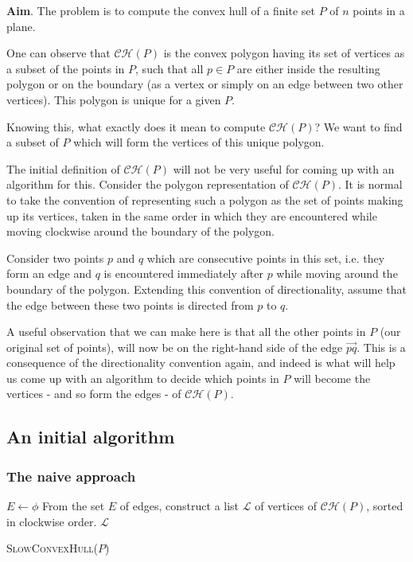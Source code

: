 \documentclass{article}
\begin{document}
\textbf{Aim}. The problem is to compute the convex hull of a finite set $P$ of $n$ points in a plane.

One can observe that $\mathcal{CH}(P)$ is the convex polygon having its set of vertices as a subset of the points in $P$, such that all $p \in P$ are either inside the resulting polygon or on the boundary (as a vertex or simply on an edge between two other vertices). This polygon is unique for a given $P$.

Knowing this, what exactly does it mean to compute $\mathcal{CH}(P)$? We want to find a subset of $P$ which will form the vertices of this unique polygon. 

The initial definition of $\mathcal{CH}(P)$ will not be very useful for coming up with an algorithm for this. Consider the polygon representation of $\mathcal{CH}(P)$. It is normal to take the convention of representing such a polygon as the set of points making up its vertices, taken in the same order in which they are encountered while moving clockwise around the boundary of the polygon.

Consider two points $p$ and $q$ which are consecutive points in this set, i.e. they form an edge and $q$ is encountered immediately after $p$ while moving around the boundary of the polygon. Extending this convention of directionality, assume that the edge between these two points is directed from $p$ to $q$.

A useful observation that we can make here is that all the other points in $P$ (our original set of points), will now be on the right-hand side of the edge $\overrightarrow{pq}$. This is a consequence of the directionality convention again, and indeed is what will help us come up with an algorithm to decide which points in $P$ will become the vertices - and so form the edges - of $\mathcal{CH}(P)$.

\subsection{An initial algorithm}

\subsubsection{The naive approach}

\begin{algorithm}[H]
\DontPrintSemicolon %
$E \leftarrow \phi $\;
From the set $E$ of edges, construct a list $\mathcal{L}$ of vertices of $\mathcal{CH}(P)$, sorted in clockwise order.\;
\Return $\mathcal{L}$\;
\caption{\textsc{SlowConvexHull}($P$)}
\end{algorithm}
\end{document}
